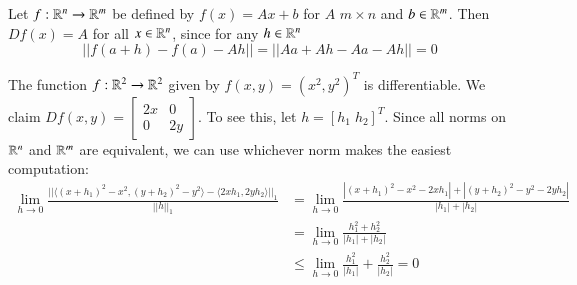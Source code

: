 \begin{example}
    Let $f:\mathbb R^n\rightarrow \mathbb R^m$ be defined by $f(x) = Ax+b$ for $A$ $m\times n$ and $b \in \mathbb R^m$. Then $Df(x) = A$ for all $x \in \mathbb R^n$, since for any $h \in \mathbb R^n$ $$||f(a+h) - f(a) - Ah|| = ||Aa+Ah-Aa-Ah|| = 0$$
\end{example}

\begin{example}
    The function $f:\mathbb R^2\rightarrow \mathbb R^2$ given by $f(x,y) = (x^2,y^2)^T$ is differentiable. We claim $Df(x,y) = \begin{bmatrix} 2x & 0 \\ 0 & 2y \end{bmatrix}$. To see this, let $h = [h_1\;h_2]^T$. Since all norms on $\mathbb R^n$ and $\mathbb R^m$ are equivalent, we can use whichever norm makes the easiest computation: \begin{align*}
        \lim\limits_{h\rightarrow 0}\frac{||\langle (x+h_1)^2 - x^2, (y+h_2)^2 - y^2\rangle - \langle 2xh_1, 2yh_2\rangle||_1}{||h||_1} &= \lim\limits_{h\rightarrow 0}\frac{|(x+h_1)^2-x^2-2xh_1| + |(y+h_2)^2-y^2-2yh_2|}{|h_1|+|h_2|} \\
        &= \lim\limits_{h\rightarrow 0}\frac{h_1^2+h_2^2}{|h_1|+|h_2|} \\
        &\leq \lim\limits_{h\rightarrow 0}\frac{h_1^2}{|h_1|} + \frac{h_2^2}{|h_2|} = 0
    \end{align*}
\end{example}


